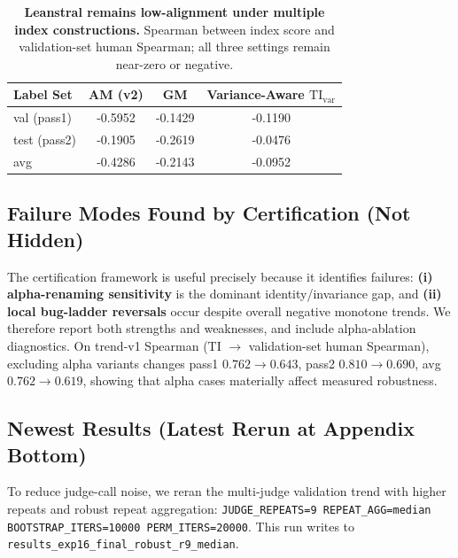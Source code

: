 \documentclass{article}
\begin{document}
\begin{table}[t]
  \centering
  \small
  \begin{tabular}{lccc}
    \toprule
    \textbf{Label Set} & \textbf{AM (v2)} & \textbf{GM} & \textbf{Variance-Aware \(\mathrm{TI}_{\mathrm{var}}\)} \\
    \midrule
    val (pass1)        & -0.5952          & -0.1429     & -0.1190                                                \\
    test (pass2)       & -0.1905          & -0.2619     & -0.0476                                                \\
    avg                & -0.4286          & -0.2143     & -0.0952                                                \\
    \bottomrule
  \end{tabular}
  \caption{\textbf{Leanstral remains low-alignment under multiple index constructions.}
    Spearman between index score and validation-set human Spearman; all three settings remain near-zero or negative.}
  \label{tab:app-leanstral-index-reagg}
\end{table}

\subsection{Failure Modes Found by Certification (Not Hidden)}
The certification framework is useful precisely because it identifies failures:
\textbf{(i) alpha-renaming sensitivity} is the dominant identity/invariance gap,
and \textbf{(ii) local bug-ladder reversals} occur despite overall negative monotone trends.
We therefore report both strengths and weaknesses, and include alpha-ablation diagnostics.
On trend-v1 Spearman (TI \(\rightarrow\) validation-set human Spearman), excluding alpha variants changes
pass1 \(0.762\rightarrow0.643\), pass2 \(0.810\rightarrow0.690\), avg \(0.762\rightarrow0.619\),
showing that alpha cases materially affect measured robustness.

\subsection{Newest Results (Latest Rerun at Appendix Bottom)}
To reduce judge-call noise, we reran the multi-judge validation trend with higher repeats and robust repeat aggregation:
\texttt{JUDGE\_REPEATS=9 REPEAT\_AGG=median BOOTSTRAP\_ITERS=10000 PERM\_ITERS=20000}.
This run writes to \texttt{results\_exp16\_final\_robust\_r9\_median}.
\end{document}
